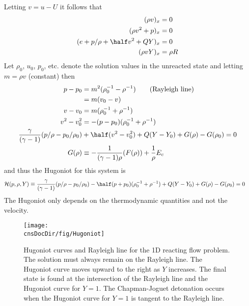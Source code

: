 \documentclass{article}
\newcommand{\obDir}{\homeHenshaw/res/OverBlown}
\newcommand{\cnsDocDir}{../cns}
\begin{document}
Letting $v=u-U$ it follows that 
\begin{align*}
  (\rho v)_x &=0 \\
  (\rho v^2 + p )_x &=0 \\
  (e + p/\rho + \half v^2 + Q Y )_x &=0 \\
   (\rho v Y)_x &= \rho R 
\end{align*}
Let $\rho_0$, $u_0$, $p_0$, etc. denote the solution values in the unreacted state and
letting $m=\rho v$ (constant) then
\begin{align*}
   p - p_0 &= m^2 ( \rho_0^{-1} - \rho^{-1} ) \qquad\mbox{(Rayleigh line)} \\
           & = m ( v_0 - v )  \\
   v - v_0 &= m( \rho_0^{-1} + \rho^{-1} ) \\
    v^2 - v_0^2 &= -(p - p_0)( \rho_0^{-1} + \rho^{-1} ) \\
   {\gamma\over (\gamma-1)} (p/\rho - p_0/\rho_0 ) &+ \half( v^2 - v_0^2) + Q(Y-Y_0) + G(\rho)-G(\rho_0) =0\\
   G(\rho) &\equiv - {1\over (\gamma-1)\rho} (F(\rho) ) + {1 \over \rho} E_c 
\end{align*}
and thus the Hugoniot for this system is 
\begin{align*}
  {\cal H}(p,\rho,Y) &\equiv 
      {\gamma\over (\gamma-1)} (p/\rho - p_0/\rho_0 ) -\half(p + p_0)( \rho_0^{-1} + \rho^{-1} ) 
           + Q(Y-Y_0) + G(\rho)-G(\rho_0) =0
\end{align*}
The Hugoniot only depends on the thermodynamic quantities and not the velocity.


\begin{figure}[hbt]
  \begin{center}
    \texttt{[image: \\cnsDocDir/fig/Hugoniot]}
  \end{center}
\caption{Hugoniot curves and Rayleigh line for the 1D reacting flow problem. The solution must always remain
  on the Rayleigh line. The Hugoniot curve moves upward to the right as $Y$ increases. The final state
   is found at the intersection of the Rayleigh line and the Hugoniot curve for $Y=1$. The Chapman-Joguet
detonation occurs when the Hugoniot curve for $Y=1$ is tangent to the Rayleigh line.} \label{fig:Hugoniot}
\end{figure}

\end{document}
